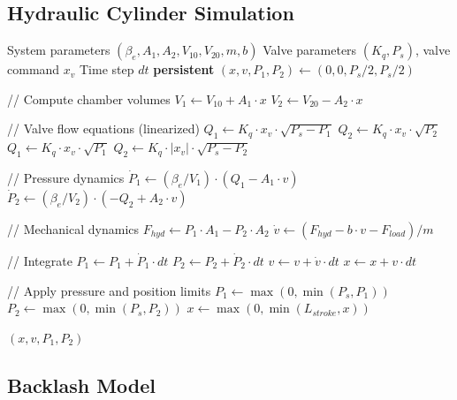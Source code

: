 \subsection{Hydraulic Cylinder Simulation}

\begin{algorithm}
\caption{Hydraulic Cylinder with Servo Valve}
\begin{algorithmic}[1]
\REQUIRE System parameters $(\beta_e, A_1, A_2, V_{10}, V_{20}, m, b)$
\REQUIRE Valve parameters $(K_q, P_s)$, valve command $x_v$
\REQUIRE Time step $dt$
\STATE \textbf{persistent} $(x, v, P_1, P_2) \gets (0, 0, P_s/2, P_s/2)$

\STATE // Compute chamber volumes
\STATE $V_1 \gets V_{10} + A_1 \cdot x$
\STATE $V_2 \gets V_{20} - A_2 \cdot x$

\STATE // Valve flow equations (linearized)
    \STATE $Q_1 \gets K_q \cdot x_v \cdot \sqrt{P_s - P_1}$
    \STATE $Q_2 \gets K_q \cdot x_v \cdot \sqrt{P_2}$
\ELSE
    \STATE $Q_1 \gets K_q \cdot x_v \cdot \sqrt{P_1}$
    \STATE $Q_2 \gets K_q \cdot |x_v| \cdot \sqrt{P_s - P_2}$
\ENDIF

\STATE // Pressure dynamics
\STATE $\dot{P}_1 \gets (\beta_e / V_1) \cdot (Q_1 - A_1 \cdot v)$
\STATE $\dot{P}_2 \gets (\beta_e / V_2) \cdot (-Q_2 + A_2 \cdot v)$

\STATE // Mechanical dynamics
\STATE $F_{hyd} \gets P_1 \cdot A_1 - P_2 \cdot A_2$
\STATE $\dot{v} \gets (F_{hyd} - b \cdot v - F_{load}) / m$

\STATE // Integrate
\STATE $P_1 \gets P_1 + \dot{P}_1 \cdot dt$
\STATE $P_2 \gets P_2 + \dot{P}_2 \cdot dt$
\STATE $v \gets v + \dot{v} \cdot dt$
\STATE $x \gets x + v \cdot dt$

\STATE // Apply pressure and position limits
\STATE $P_1 \gets \max(0, \min(P_s, P_1))$
\STATE $P_2 \gets \max(0, \min(P_s, P_2))$
\STATE $x \gets \max(0, \min(L_{stroke}, x))$

\RETURN $(x, v, P_1, P_2)$
\end{algorithmic}
\end{algorithm}

\subsection{Backlash Model}

